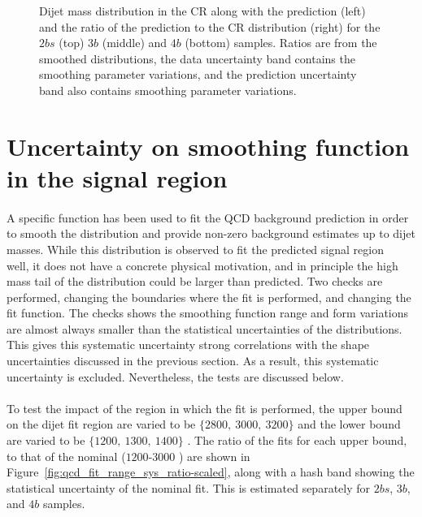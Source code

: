 \begin{figure}[htb!]
\begin{center}
\caption{Dijet mass distribution in the CR along with the prediction (left) and the ratio of the prediction to the CR distribution (right)  for the $2bs$ (top) $3b$ (middle) and $4b$ (bottom) samples.  Ratios are from the smoothed distributions, the data uncertainty band contains the smoothing parameter variations, and the prediction uncertainty band also contains smoothing parameter variations.}
\label{fig:qcd_shape_fit}
\end{center}
\end{figure}

\section{Uncertainty on smoothing function in the signal region}
\label{unc-smooth-qcd-in-sr}

\paragraph{}
A specific function has been used to fit the QCD background prediction in order to smooth the distribution and provide non-zero background estimates up to dijet masses.  
While this distribution is observed to fit the predicted signal region \mtwoJ~ well, it does not have a concrete physical motivation, and in principle the high mass tail of the distribution could be larger than predicted.
Two checks are performed, changing the boundaries where the fit is performed, and changing the fit function.
The checks shows the smoothing function range and form variations are almost always smaller than the statistical uncertainties of the distributions.
This gives this systematic uncertainty strong correlations with the shape uncertainties discussed in the previous section.
As a result, this systematic uncertainty is excluded.
Nevertheless, the tests are discussed below.

\paragraph{}
To test the impact of the region in which the fit is performed, the upper bound on the dijet fit region are varied to be $\{2800,\ 3000,\ 3200\}$ \GeV and the lower bound are varied to be $\{1200,\ 1300,\ 1400\}$ \GeV.  
The ratio of the fits for each upper bound, to that of the nominal ($1200$-$3000$ \GeV) are shown in Figure~\ref{fig:qcd_fit_range_sys_ratio-scaled}, along with a hash band showing the statistical uncertainty of the nominal fit.
This is estimated separately for $2bs$, $3b$, and $4b$ samples.

